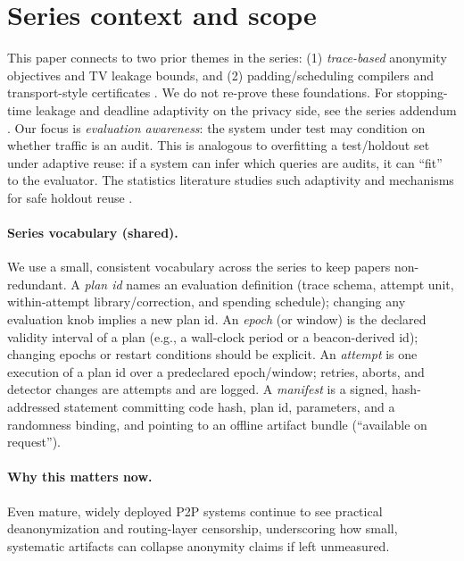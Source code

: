 \documentclass[11pt]{article}
\begin{document}
\section{Series context and scope}
This paper connects to two prior themes in the series:
(1) \emph{trace-based} anonymity objectives and TV leakage bounds, and
(2) padding/scheduling compilers and transport-style certificates \cite{series:schedcompiler,series:knapsacktransport}.
We do not re-prove these foundations.
For stopping-time leakage and deadline adaptivity on the privacy side, see the series addendum \cite{series:stoptimeaddendum}.
Our focus is \emph{evaluation awareness}: the system under test may condition on whether traffic is an audit.
This is analogous to overfitting a test/holdout set under adaptive reuse: if a system can infer which queries are audits, it can ``fit'' to the evaluator.
The statistics literature studies such adaptivity and mechanisms for safe holdout reuse \cite{dwork2015reusableholdout,dwork2014adaptive}.

\paragraph{Series vocabulary (shared).}
We use a small, consistent vocabulary across the series to keep papers non-redundant.
A \emph{plan id} names an evaluation definition (trace schema, attempt unit, within-attempt library/correction, and spending schedule);
changing any evaluation knob implies a new plan id.
An \emph{epoch} (or window) is the declared validity interval of a plan (e.g., a wall-clock period or a beacon-derived id); changing epochs or restart conditions should be explicit.
An \emph{attempt} is one execution of a plan id over a predeclared epoch/window; retries, aborts, and detector changes are attempts and are logged.
A \emph{manifest} is a signed, hash-addressed statement committing code hash, plan id, parameters, and a randomness binding, and pointing to an offline artifact bundle (``available on request'').


\paragraph{Why this matters now.}
Even mature, widely deployed P2P systems continue to see practical deanonymization and routing-layer censorship, underscoring how small, systematic artifacts can collapse anonymity claims if left unmeasured.\cite{heimbach2025_eth_validators,sridhar2024ipfs_censorship}
\end{document}
